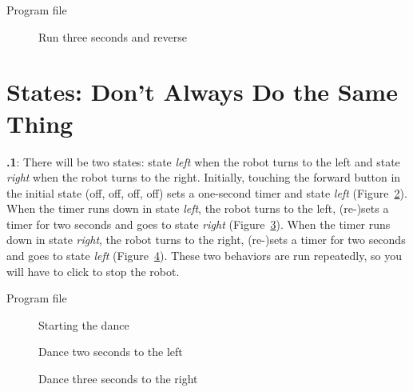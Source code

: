 \documentclass[12pt,a4paper,english]{article}
\begin{document}
{\raggedleft \hfill Program file }


\begin{figure}[hbt]
\begin{center}
\caption{Run three seconds and reverse}\label{fig.three}
\end{center}
\end{figure}


\section{States: Don't Always Do the Same Thing}

\textbf{\thesection.1}:
There will be two states: state \emph{left}  when the
robot turns to the left and state \emph{right}  when
the robot turns to the right. Initially, touching the forward button in
the initial state (off, off, off, off) sets a one-second timer and state
\emph{left} (Figure~\ref{fig.dance-start}). When the timer runs down in
state \emph{left}, the robot turns to the left, (re-)sets a timer for
two seconds and goes to state \emph{right}
(Figure~\ref{fig.dance-left}). When the timer runs down in state
\emph{right}, the robot turns to the right, (re-)sets a timer for two
seconds and goes to state \emph{left} (Figure~\ref{fig.dance-right}).
These two behaviors are run repeatedly, so you will have to click
 to stop the robot.

{\raggedleft \hfill Program file }


\begin{figure}
\begin{center}
\caption{Starting the dance}\label{fig.dance-start}
\end{center}
\end{figure}

\begin{figure}
\begin{center}
\caption{Dance two seconds to the left}\label{fig.dance-left}
\end{center}
\end{figure}

\begin{figure}
\begin{center}
\caption{Dance three seconds to the right}\label{fig.dance-right}
\end{center}
\end{figure}
\end{document}
